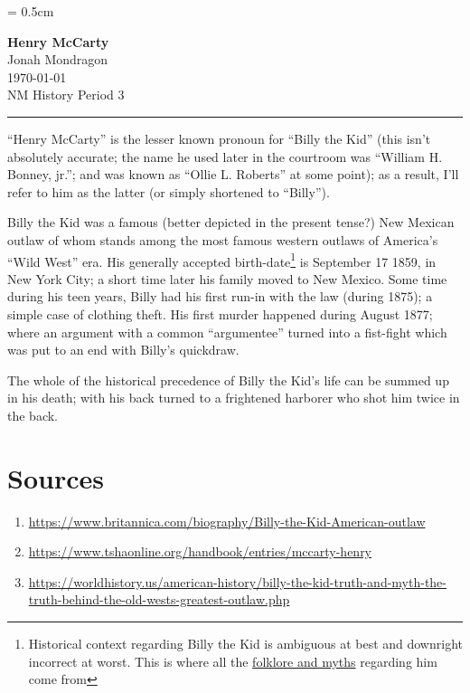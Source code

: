 \documentclass[12pt]{article}
\begin{document}
\parskip = 0.5cm

\begin{center}
    {\huge\bfseries Henry McCarty}\\
    Jonah Mondragon\\
    \today\\
    NM History Period 3
    \vspace{1ex}
    \hrule
\end{center}

\pagestyle{headings}

\noindent
``Henry McCarty'' is the lesser known pronoun for ``Billy the Kid''
(this isn't absolutely accurate; the name he used later in the courtroom was ``William H. Bonney, jr.''; and was known as ``Ollie L. Roberts'' at some point);
as a result, I'll refer to him as the latter (or simply shortened to ``Billy'').

Billy the Kid was a famous (better depicted in the present tense?) New Mexican outlaw of whom stands among the most famous western outlaws of America's ``Wild West'' era.
His generally accepted birth-date\footnote{
    Historical context regarding Billy the Kid is ambiguous at best and downright incorrect at worst. This is where all the 
    \href{https://worldhistory.us/american-history/billy-the-kid-truth-and-myth-the-truth-behind-the-old-wests-greatest-outlaw.php}{folklore and myths} regarding him come from}
%
is September 17 1859, in New York City; a short time later his family moved to New Mexico.
Some time during his teen years, Billy had his first run-in with the law (during 1875); a simple case of clothing theft.
His first murder happened during August 1877; where an argument with a common ``argumentee'' turned into a fist-fight which was put to an end with Billy's quickdraw.

The whole of the historical precedence of Billy the Kid's life can be summed up in his death; with his back turned to a frightened harborer who shot him twice in the back.

\newpage
\sloppy

\section{Sources}
\begin{enumerate}
    \item{\url{https://www.britannica.com/biography/Billy-the-Kid-American-outlaw}}
    \item{\url{https://www.tshaonline.org/handbook/entries/mccarty-henry}}
    \item{\url{https://worldhistory.us/american-history/billy-the-kid-truth-and-myth-the-truth-behind-the-old-wests-greatest-outlaw.php}}
\end{enumerate}
\end{document}
